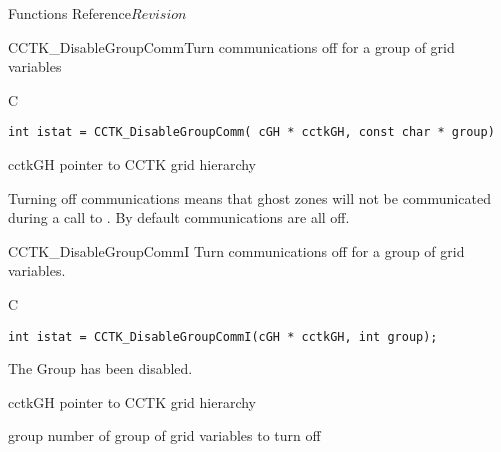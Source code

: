 \begin{cactuspart}{ Functions Reference}{}{$Revision$}
\begin{FunctionDescription}{CCTK\_DisableGroupComm}{Turn communications off for a group of grid variables}
\label{CCTK-DisableGroupComm}
\begin{SynopsisSection}
\begin{Synopsis}{C}
\begin{verbatim}int istat = CCTK_DisableGroupComm( cGH * cctkGH, const char * group)\end{verbatim}
\end{Synopsis}
\end{SynopsisSection}
\begin{ParameterSection}
\begin{Parameter}{cctkGH}
pointer to CCTK grid hierarchy
\end{Parameter}
\end{ParameterSection}
\begin{Discussion}
Turning off communications means that ghost zones will not be
communicated during a call to . By default
communications are all off.
\end{Discussion}
\end{FunctionDescription}

\begin{FunctionDescription}{CCTK\_DisableGroupCommI}
\label{CCTK-DisableGroupCommI}
Turn communications off for a group of grid variables.
\begin{SynopsisSection}
\begin{Synopsis}{C}
\begin{verbatim}
int istat = CCTK_DisableGroupCommI(cGH * cctkGH, int group);
\end{verbatim}
\end{Synopsis}
\end{SynopsisSection}

\begin{ResultSection}
\begin{Result}{0}
The Group has been disabled.
\end{Result}
\end{ResultSection}

\begin{ParameterSection}
\begin{Parameter}{cctkGH}
pointer to CCTK grid hierarchy
\end{Parameter}
\begin{Parameter}{group}
number of group of grid variables to turn off
\end{Parameter}
\end{ParameterSection}


\end{FunctionDescription}
\end{cactuspart}
